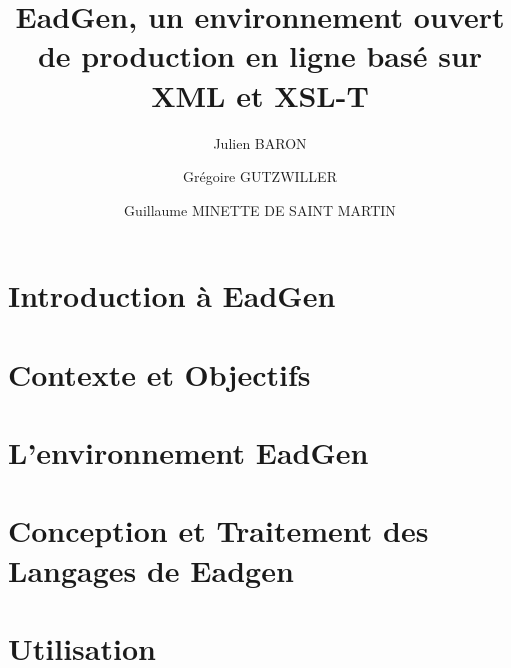 \documentclass[twocolumn]{article}
\date{}
\title{EadGen, un environnement ouvert de production en ligne basé sur XML et XSL-T}
\author{Julien BARON \and Grégoire GUTZWILLER \and Guillaume MINETTE DE SAINT MARTIN}
\begin{document}
\maketitle

\section{Introduction à EadGen}


\section{Contexte et Objectifs}


\section{L’environnement EadGen}


\section{Conception et Traitement des Langages de Eadgen}


\section{Utilisation}

\end{document}
